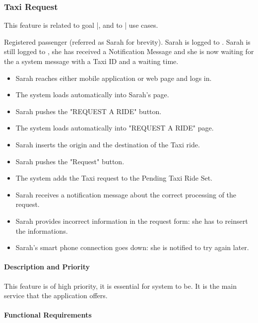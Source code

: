 \subsubsection{Taxi Request}
This feature is related to goal |, and to | use cases.
\begin{itemize}
	 Registered passenger (referred as Sarah for brevity).
	 Sarah is logged to \myTaxiService{}.
	 Sarah is still logged to \myTaxiService{}, she has received a Notification Message and she is now waiting for the a system message with a Taxi ID and a waiting time.
	\begin{itemize}
		\item Sarah reaches either \myTaxiService{} mobile application or web page and logs in.
		\item The system loads automatically into Sarah's page.
		\item Sarah pushes the "REQUEST A RIDE" button.
		\item The system loads automatically into "REQUEST A RIDE" page.
		\item Sarah inserts the origin and the destination of the Taxi ride.
		\item Sarah pushes the "Request" button.
		\item The system adds the Taxi request to the Pending Taxi Ride Set.
		\item Sarah receives a notification message about the correct processing of the request. 
	\end{itemize}
	\begin{itemize}
		\item Sarah provides incorrect information in the request form: she has to reinsert the informations.
		\item Sarah's smart phone connection goes down: she is notified to try again later.
	\end{itemize}
\end{itemize}
\paragraph{Description and Priority}
This feature is of high priority, it is essential for \myTaxiService{} system to be. It is the main service that the application offers.
\paragraph{Functional Requirements}
\begin{itemize}
\end{itemize}

